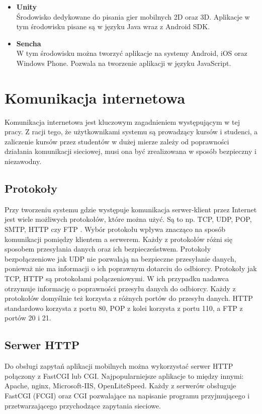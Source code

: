 \documentclass[archivemod, eng]{mgr}
\begin{document}
\begin{itemize}
				\item \textbf{Unity}\\
				Środowisko dedykowane do pisania gier mobilnych 2D oraz 3D. Aplikacje w tym środowisku pisane są w języku Java wraz z Android SDK.
				
				\item \textbf{Sencha}\\
				W tym środowisku można tworzyć aplikacje na systemy Android, iOS oraz Windows Phone. Pozwala na tworzenie aplikacji w języku JavaScript.
				
			\end{itemize}
	
		\section{Komunikacja internetowa}
		Komunikacja internetowa jest kluczowym zagadnieniem występującym w tej pracy. Z racji tego, że użytkownikami systemu są prowadzący kursów i studenci, a zaliczenie kursów przez studentów w dużej mierze zależy od poprawności działania komunikacji sieciowej, musi ona być zrealizowana w sposób bezpieczny i niezawodny.
		
			\subsection{Protokoły}
			Przy tworzeniu systemu gdzie występuje komunikacja serwer-klient przez Internet jest wiele możliwych protokołów, które można użyć. Są to np. TCP, UDP, POP, SMTP, HTTP czy FTP \cite{protocols}. Wybór protokołu wpływa znacząco na sposób komunikacji pomiędzy klientem a serwerem. Każdy z protokołów różni się sposobem przesyłania danych oraz ich bezpieczeństwem. Protokoły bezpołączeniowe jak UDP nie pozwalają na bezpieczne przesyłanie danych, ponieważ nie ma informacji o ich poprawnym dotarciu do odbiorcy. Protokoły jak TCP, HTTP są protokołami połączeniowymi. W ich przypadku nadawca otrzymuje informację o poprawności przesyłu danych do odbiorcy. Każdy z protokołów domyślnie też korzysta z różnych portów do przesyłu danych. HTTP standardowo korzysta z portu 80, POP z kolei korzysta z portu 110, a FTP z portów 20 i 21.
	
			\subsection{Serwer HTTP}
			Do obsługi zapytań aplikacji mobilnych można wykorzystać serwer HTTP połączony z FastCGI \cite{fcgi} lub CGI. Najpopularniejsze aplikacje \cite{httpserversusage} to między innymi: Apache, nginx, Microsoft-IIS, OpenLiteSpeed. Każdy z serwerów obsługuje FastCGI (FCGI) oraz CGI pozwalające na napisanie programu przyjmującego i przetwarzającego przychodzące zapytania sieciowe.\\
			
\end{document}
